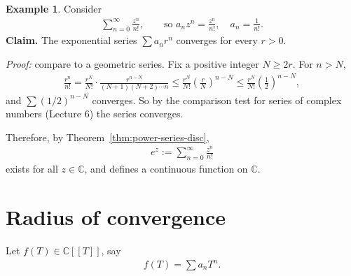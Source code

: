 \documentclass[11pt]{article}
\theoremstyle{plain}
\theoremstyle{definition}
\newtheorem{example}[theorem]{Example}
\theoremstyle{remark}
\numberwithin{equation}{section}
\newcommand{\be}{\begin{eqnarray}}
\newcommand{\ee}{\end{eqnarray}}
\newcommand{\C}{\mathbb{C}}
\newcommand{\CT}{\C[[T]]}
\begin{document}
\begin{example}
Consider
\be
 \sum_{n=0}^{\infty}\frac{z^n}{n!},
 \qquad\text{so } a_nz^n=\frac{z^n}{n!},\quad a_n=\frac1{n!}.
\ee
\textbf{Claim.} The exponential series $\sum a_nr^n$ converges for every
$r>0$.

\emph{Proof:} compare to a geometric series. Fix a positive integer
$N\ge2r$. For
$n>N$,
\be
 \frac{r^n}{n!}=\frac{r^N}{N!}\cdot\frac{r^{n-N}}{(N+1)(N+2)\cdots n}
 \le\frac{r^N}{N!}\left(\frac rN\right)^{n-N}
 \le\frac{r^N}{N!}\left(\frac12\right)^{n-N},
\ee
and $\sum(1/2)^{n-N}$ converges. So by the comparison test for series of
complex numbers (Lecture 6) the series converges.

Therefore, by Theorem~\ref{thm:power-series-disc},
\be
 \boxed{\ e^z:=\sum_{n=0}^{\infty}\frac{z^n}{n!}\ }
\ee
exists for all $z\in\C$, and defines a continuous function on $\C$.
\end{example}

\section{Radius of convergence}
Let $f(T)\in\CT$, say
\be
 f(T)=\sum a_nT^n.
\ee
\end{document}
